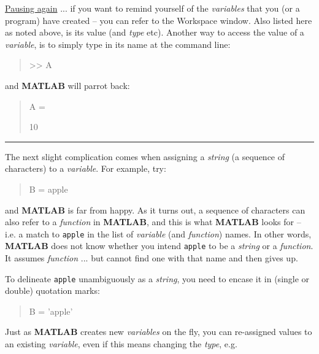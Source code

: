 \documentclass{tufte-book} %
\newenvironment{docspec}{\begin{quotation}\ttfamily\parskip0pt\parindent0pt\ignorespaces}{\end{quotation}}
\begin{document}
\noindent \uline{Pausing again} ... if you want to remind yourself of the \textit{variables} that you (or a program) have created -- you can refer to the \textsf{Workspace} window. Also listed here as noted above, is its value (and \textit{type} etc). Another way to access the value of a \textit{variable}, is to simply type in its name at the command line:

\begin{docspec}
>> A
\end{docspec}

\noindent and \textbf{MATLAB} will parrot back:

\begin{docspec}
A =

    10
\end{docspec}

\vspace{1mm}
\noindent\rule{4cm}{0.5pt}
\vspace{2mm}

\noindent The next slight complication comes when assigning a \textit{string} (a sequence of characters) to a \textit{variable}. For example, try:

\begin{docspec}
B = apple
\end{docspec}

\noindent and \textbf{MATLAB} is far from happy. As it turns out,  a sequence of characters  can also refer to a \textit{function} in \textbf{MATLAB}, and this is what \textbf{MATLAB} looks for -- i.e. a match to \texttt{apple} in the list of \textit{variable} (and \textit{function}) names. In other words, \textbf{MATLAB} does not know whether you intend \texttt{apple} to be a \textit{string} or a \textit{function}. It assumes \textit{function} ... but cannot find one with that name and then gives up. 

To delineate \texttt{apple} unambiguously as a \textit{string}, you need to encase it in (single or double) quotation marks:

\begin{docspec}
B = 'apple'
\end{docspec}

Just as \textbf{MATLAB} creates new \textit{variables} on the fly, you can re-assigned values to an existing \textit{variable}, even if this means changing the \textit{type}, e.g.
\end{document}
